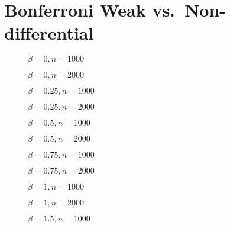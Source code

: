 \section{Bonferroni Weak vs.\ Non-differential}

\begin{figure}
  \centering
  
  \caption{$\beta = 0, n = 1000$}
\end{figure}

\begin{figure}
  \centering
  
  \caption{$\beta = 0, n = 2000$}
\end{figure}
\begin{figure}
  \centering
  
  \caption{$\beta = 0.25, n = 1000$}
\end{figure}

\begin{figure}
  \centering
  
  \caption{$\beta = 0.25, n = 2000$}
\end{figure}
\begin{figure}
  \centering
  
  \caption{$\beta = 0.5, n = 1000$}
\end{figure}

\begin{figure}
  \centering
  
  \caption{$\beta = 0.5, n = 2000$}
\end{figure}
\begin{figure}
  \centering
  
  \caption{$\beta = 0.75, n = 1000$}
\end{figure}

\begin{figure}
  \centering
  
  \caption{$\beta = 0.75, n = 2000$}
\end{figure}
\begin{figure}
  \centering
  
  \caption{$\beta = 1, n = 1000$}
\end{figure}

\begin{figure}
  \centering
  
  \caption{$\beta = 1, n = 2000$}
\end{figure}
\begin{figure}
  \centering
  
  \caption{$\beta = 1.5, n = 1000$}
\end{figure}

